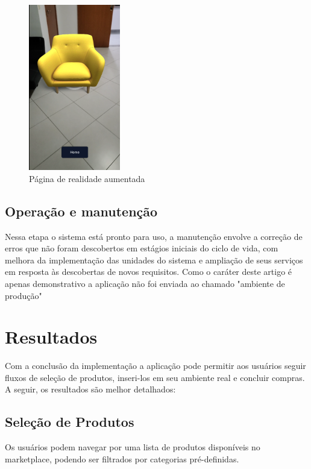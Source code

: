 \documentclass[conference]{IEEEtran}
\begin{document}
\begin{figure}[h]
  \caption{Página de realidade aumentada}

  \centering %
  \includegraphics[width=4cm]{assets/test_page.png}
\end{figure}

\subsection{Operação e manutenção}
Nessa etapa o sistema está pronto para uso, a manutenção envolve a correção de
erros que não foram descobertos em estágios iniciais do ciclo de vida, com
melhora da implementação das unidades do sistema e ampliação de seus serviços
em resposta às descobertas de novos requisitos. Como o caráter deste artigo é
apenas demonstrativo a aplicação não foi enviada ao chamado "ambiente de
produção"

\section{Resultados}
Com a conclusão da implementação a aplicação pode permitir aos usuários seguir
fluxos de seleção de produtos, inseri-los em seu ambiente real e concluir
compras. A seguir, os resultados são melhor detalhados:

\subsection{Seleção de Produtos}\label{AA}
Os usuários podem navegar por uma lista de produtos disponíveis no marketplace,
podendo ser filtrados por categorias pré-definidas.
\end{document}

